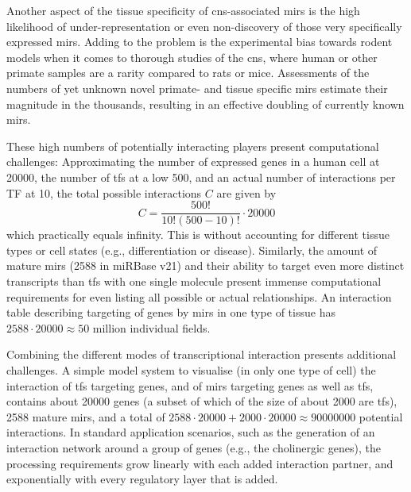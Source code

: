Another aspect of the tissue specificity of \ac{cns}-associated \acp{mir} is the high likelihood of under-representation or even non-discovery of those very specifically expressed \acp{mir}. Adding to the problem is the experimental bias towards rodent models when it comes to thorough studies of the \ac{cns}, where human or other primate samples are a rarity compared to rats or mice. Assessments of the numbers of yet unknown novel primate- and tissue specific \acp{mir} estimate their magnitude in the thousands,\cite{Londin2015} resulting in an effective doubling of currently known \acp{mir}.

These high numbers of potentially interacting players present computational challenges: Approximating the number of expressed genes in a human cell at \num{20000}, the number of \acp{tf} at a low 500, and an actual number of interactions per TF at 10, the total possible interactions $C$ are given by $$ C = \frac{500!}{10!(500-10)!} \cdot \num{20000} $$ which practically equals infinity. This is without accounting for different tissue types or cell states (e.g., differentiation or disease). Similarly, the amount of mature \acp{mir} (2588 in miRBase v21) and their ability to target even more distinct transcripts than \acp{tf} with one single molecule present immense computational requirements for even listing all possible or actual relationships. An interaction table describing targeting of genes by \acp{mir} in one type of tissue has $ 2588 \cdot \num{20000} \approx 50$ million individual fields.

Combining the different modes of transcriptional interaction presents additional challenges. A simple model system to visualise (in only one type of cell) the interaction of \acp{tf} targeting genes, and of \acp{mir} targeting genes as well as \acp{tf}, contains about \num{20000} genes (a subset of which of the size of about 2000 are \acp{tf}), 2588 mature \acp{mir}, and a total of $ 2588 \cdot \num{20000} + 2000 \cdot \num{20000} \approx \num{90000000} $ potential interactions. In standard application scenarios, such as the generation of an interaction network around a group of genes (e.g., the cholinergic genes), the processing requirements grow linearly with each added interaction partner, and exponentially with every regulatory layer that is added.

